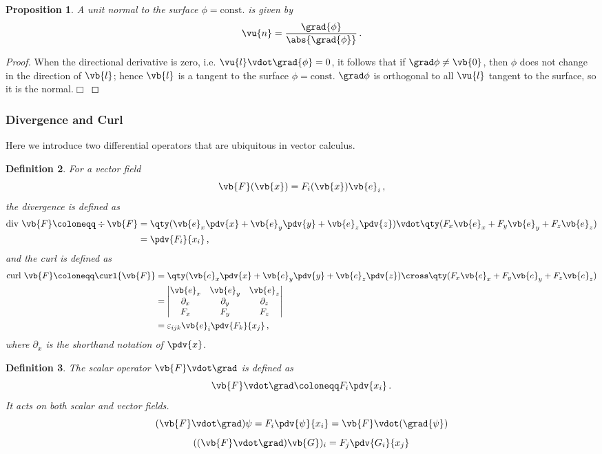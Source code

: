 \documentclass{article}
\theoremstyle{plain}\theoremheaderfont{\normalfont\itshape}\theorembodyfont{\rmfamily}\theoremseparator{.}\newtheorem*{rem}{Remark}\newtheorem*{ex}{Example}\newtheorem*{proof}{Proof}\newtheorem*{altp}{Alternative proof}
\theoremstyle{plain}\theoremheaderfont{\normalfont\bfseries}\theorembodyfont{\rmfamily}\theoremseparator{.}\newtheorem{thm}{Theorem}[section]\newtheorem{lem}[thm]{Lemma}\newtheorem{prop}[thm]{Proposition}\newtheorem*{cor}{Corollary}\newtheorem{defn}[thm]{Definition}\newtheorem{clm}[thm]{Claim}\newtheorem{clminproof}{Claim}
\theoremstyle{break}\theoremheaderfont{\normalfont\itshape}\theorembodyfont{\rmfamily}\theoremseparator{.\medskip}\newtheorem*{proofskip}{Proof}\newtheorem*{exs}{Examples}\newtheorem*{rems}{Remarks}
\theoremstyle{break}\theoremheaderfont{\normalfont\bfseries}\theorembodyfont{\rmfamily}\theoremseparator{.\medskip}\newtheorem{lemskip}[thm]{Lemma}\newtheorem{defnskip}[thm]{Definition}\newtheorem{propskip}[thm]{Proposition}\newtheorem{thmskip}[thm]{Theorem}
\numberwithin{equation}{section}
\newcommand{\qed}{\hfill\ensuremath{\Box}}
\begin{document}
	\begin{prop}
		A unit normal to the surface \(\phi=\text{const.}\) is given by
		\[\vu{n}=\frac{\grad{\phi}}{\abs{\grad{\phi}}}\,.\]
	\end{prop}
	\begin{proof}
		When the directional derivative is zero, i.e. \(\vu{l}\vdot\grad{\phi}=0\), it follows that if \(\grad\phi\ne \vb{0}\), then \(\phi\) does not change in the direction of \(\vb{l}\); hence \(\vb{l}\) is a tangent to the surface \(\phi=\text{const}\). \(\grad\phi\) is orthogonal to all \(\vu{l}\) tangent to the surface, so it is the normal.\qed
	\end{proof}
	
	\subsubsection{Divergence and Curl}
	Here we introduce two differential operators that are ubiquitous in vector calculus.
	\begin{defn}
		For a vector field
		\[\vb{F}(\vb{x})=F_i(\vb{x})\vb{e}_i\,,\]
		the \textit{divergence} is defined as
		\begin{align*}
			\text{div }\vb{F}\coloneqq\div{\vb{F}}&=\qty(\vb{e}_x\pdv{x}+\vb{e}_y\pdv{y}+\vb{e}_z\pdv{z})\vdot\qty(F_x\vb{e}_x+F_y\vb{e}_y+F_z\vb{e}_z)\\
			&=\pdv{F_i}{x_i}\,,
		\end{align*}
		and the \textit{curl} is defined as
		\begin{align*}
			\text{curl }\vb{F}\coloneqq\curl{\vb{F}}&=\qty(\vb{e}_x\pdv{x}+\vb{e}_y\pdv{y}+\vb{e}_z\pdv{z})\cross\qty(F_x\vb{e}_x+F_y\vb{e}_y+F_z\vb{e}_z)\\
			&=\begin{vmatrix}
				\vb{e}_x & \vb{e}_y & \vb{e}_z\\
				\partial_x & \partial_y & \partial_z\\
				F_x & F_y & F_z
			\end{vmatrix}\\
			&=\varepsilon_{ijk}\vb{e}_i\pdv{F_k}{x_j}\,,
		\end{align*}
		where \(\partial_x\) is the shorthand notation of \(\pdv{x}\).
	\end{defn}
	
	\begin{defn}
		The scalar operator \(\vb{F}\vdot\grad\) is defined as
		\[\vb{F}\vdot\grad\coloneqq F_i\pdv{x_i}\,.\]
		It acts on both scalar and vector fields.
		\[(\vb{F}\vdot\grad)\psi=F_i\pdv{\psi}{x_i}=\vb{F}\vdot(\grad{\psi})\]
		\[((\vb{F}\vdot\grad)\vb{G})_i=F_j\pdv{G_i}{x_j}\]
	\end{defn}
	
\end{document}
